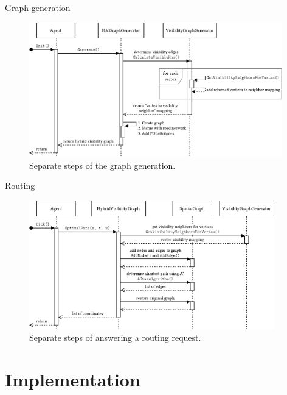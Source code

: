 \documentclass[xcolor={x11names}]{beamer}
\newenvironment{figcenter}
{%
	\parskip=0pt%
	\par%
	\nopagebreak%
	\centering%
}%
{%
	\par%
	\noindent%
	\ignorespacesafterend%
}
\begin{document}
		\begin{frame}{Graph generation}
			\begin{figure}[t]
				\begin{figcenter}
					\includegraphics[width=0.98\textwidth]{images/components-sequence-generation-short.pdf}
				\end{figcenter}
				\caption{Separate steps of the graph generation.}
			\end{figure}
		\end{frame}
		
		\begin{frame}{Routing}
			\begin{figure}[t]
				\begin{figcenter}
					\includegraphics[width=0.95\textwidth]{images/components-sequence-routing-short.pdf}
				\end{figcenter}
				\caption{Separate steps of answering a routing request.}
			\end{figure}
		\end{frame}
	
	\section{Implementation}
	
\end{document}
